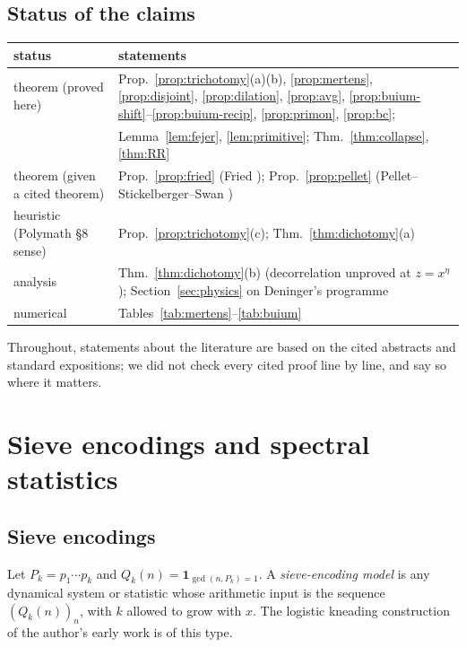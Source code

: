 \documentclass[11pt]{amsart}
\theoremstyle{definition}
\theoremstyle{remark}
\newcommand{\one}{\mathbf 1}
\begin{document}
\subsection{Status of the claims}
\begin{center}\small
\begin{tabular}{p{}p{}}
\toprule
status & statements\\
\midrule
theorem (proved here) & Prop.~\ref{prop:trichotomy}(a)(b), \ref{prop:mertens}, \ref{prop:disjoint}, \ref{prop:dilation}, \ref{prop:avg}, \ref{prop:buium-shift}--\ref{prop:buium-recip}, \ref{prop:primon}, \ref{prop:bc};\\
& Lemma~\ref{lem:fejer}, \ref{lem:primitive}; Thm.~\ref{thm:collapse}, \ref{thm:RR}\\
theorem (given a cited theorem) & Prop.~\ref{prop:fried} (Fried \cite{Fri70}); Prop.~\ref{prop:pellet} (Pellet--Stickelberger--Swan \cite{Swa62})\\
heuristic (Polymath \S8 sense) & Prop.~\ref{prop:trichotomy}(c); Thm.~\ref{thm:dichotomy}(a)\\
analysis & Thm.~\ref{thm:dichotomy}(b) (decorrelation unproved at $z=x^\eta$); Section~\ref{sec:physics} on Deninger's programme\\
numerical & Tables~\ref{tab:mertens}--\ref{tab:buium}\\
\bottomrule
\end{tabular}
\end{center}

Throughout, statements about the literature are based on the cited abstracts and standard expositions; we did not check every cited proof line by line, and say so where it matters.

\section{Sieve encodings and spectral statistics}\label{sec:sieve}

\subsection{Sieve encodings}
Let $P_k=p_1\cdots p_k$ and $Q_k(n)=\one_{\gcd(n,P_k)=1}$. A \emph{sieve-encoding model} is any dynamical system or statistic whose arithmetic input is the sequence $(Q_k(n))_n$, with $k$ allowed to grow with $x$. The logistic kneading construction of the author's early work is of this type.
\end{document}
